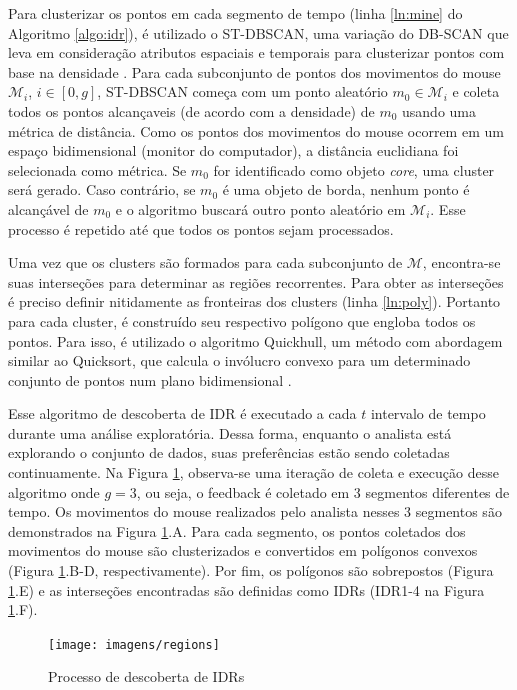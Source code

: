 Para clusterizar os pontos em cada segmento de tempo (linha \ref{ln:mine} do Algoritmo \ref{algo:idr}), é utilizado o ST-DBSCAN, uma variação do DB-SCAN que leva em consideração atributos espaciais e temporais para clusterizar pontos com base na densidade \cite{Birant:2007}. Para cada subconjunto de pontos dos movimentos do mouse $\mathcal{M}_i$, $i \in [0,g]$, ST-DBSCAN começa com um ponto aleatório $m_0 \in \mathcal{M}_i$ e coleta todos os pontos alcançaveis (de acordo com a densidade) de $m_0$ usando uma métrica de distância. Como os pontos dos movimentos do mouse ocorrem em um espaço bidimensional (monitor do computador), a distância euclidiana foi selecionada como métrica. Se $m_0$ for identificado como objeto {\em core}, uma cluster será gerado. Caso contrário, se $m_0$ é uma objeto de borda, nenhum ponto é alcançável de $m_0$ e o algoritmo buscará outro ponto aleatório em $\mathcal{M}_i$. Esse processo é repetido até que todos os pontos sejam processados.

Uma vez que os clusters são formados para cada subconjunto de $\mathcal{M}$, encontra-se suas interseções para determinar as regiões recorrentes. Para obter as interseções é preciso definir nitidamente as fronteiras dos clusters (linha \ref{ln:poly}). Portanto para cada cluster, é construído seu respectivo polígono que engloba todos os pontos. Para isso, é utilizado o algoritmo Quickhull, um método com abordagem similar ao Quicksort, que calcula o invólucro convexo para um determinado conjunto de pontos num plano bidimensional \cite{Barber:1996}.

Esse algoritmo de descoberta de IDR é executado a cada $t$ intervalo de tempo durante uma análise exploratória. Dessa forma, enquanto o analista está explorando o conjunto de dados, suas preferências estão sendo coletadas continuamente. Na Figura \ref{fig:descoberta-idr}, observa-se uma iteração de coleta e execução desse algoritmo onde $g = 3$, ou seja, o feedback é coletado em 3 segmentos diferentes de tempo. Os movimentos do mouse realizados pelo analista nesses 3 segmentos são demonstrados na Figura \ref{fig:descoberta-idr}.A. Para cada segmento, os pontos coletados dos movimentos do mouse são clusterizados e convertidos em polígonos convexos (Figura \ref{fig:descoberta-idr}.B-D, respectivamente). Por fim, os polígonos são sobrepostos (Figura \ref{fig:descoberta-idr}.E) e as interseções encontradas são definidas como IDRs (IDR1-4 na Figura \ref{fig:descoberta-idr}.F).

\begin{figure}[t]
	\centering
	\texttt{[image: imagens/regions]}
	\caption{Processo de descoberta de IDRs}
	\label{fig:descoberta-idr}
\end{figure}

